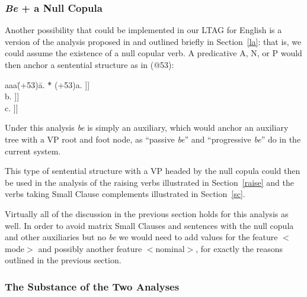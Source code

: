 \subsubsection{{\em Be\/} + a Null Copula}

\label{tagnull}
Another possibility that could be implemented in our LTAG for English is
a version of the analysis proposed in \cite{la80} and outlined briefly
in Section~\ref{la}: that is, we could assume the existence of a null
copular verb.  A predicative A, N, or P would then anchor a sentential
structure as in (@53):
\begin{tabbing}
aaa\=(+53)\=a. \= *\= \kill
   \>(+53)\>a. \>  \> [$_{S}$ NP [$_{VP}$ [$_{V}$ 0] [$_{AP}$ A \ldots ]]]  \\
   \>     \>b. \>  \> [$_{S}$ NP [$_{VP}$ [$_{V}$ 0] [$_{NP}$ N \ldots ]]]  \\
   \>     \>c. \>  \> [$_{S}$ NP [$_{VP}$ [$_{V}$ 0] [$_{PP}$ P \ldots ]]]  
\end{tabbing}

Under this analysis {\em be} is simply an auxiliary, which would anchor
an auxiliary tree with a VP root and foot node, as ``passive {\em be\/}''
and ``progressive {\em be\/}'' do in the current system.

This type of sentential structure with a VP headed by the null copula
could then be used in the analysis of the raising verbs
illustrated in Section~\ref{raise} and the verbs taking Small Clause
complements illustrated in Section~\ref{sc}.

Virtually all of the discussion in the previous section holds for this
analysis as well.  In order to avoid matrix Small Clauses and sentences
with the null copula and other auxiliaries but no {\em be} we would need
to add values for the feature $<$mode$>$ and possibly another feature
$<$nominal$>$, for exactly the reasons outlined in the previous section.

\subsubsection{The Substance of the Two Analyses}

